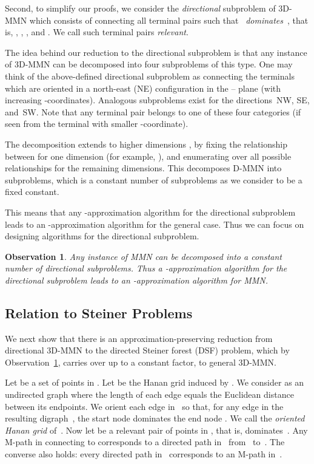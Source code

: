 \documentclass[11pt]{llncs}
\newtheorem{observation}{Observation}
\begin{document}
Second, to simplify our proofs, we consider the \emph{directional}
subproblem of 3D-MMN which consists of connecting all terminal
pairs  such that~ \emph{dominates}~, that is, , , , and .  We call such
terminal pairs \emph{relevant}.  

The idea behind our reduction to the directional subproblem is that
any instance of 3D-MMN can be decomposed into four subproblems of this
type.  One may think of the above-defined directional subproblem as
connecting the terminals which are oriented in a north-east (NE)
configuration in the -- plane (with increasing
-coor\-di\-nates).  Analogous subproblems exist for the
directions~NW, SE, and~SW.  Note that any terminal pair belongs to one
of these four categories (if seen from the terminal with smaller
-coordinate).

The decomposition extends to higher dimensions , by fixing the
relationship between  for one dimension (for example, ), and
enumerating over all possible relationships for the remaining 
dimensions. This decomposes D-MMN into  
subproblems, which is a constant number of subproblems as we consider
 to be a fixed constant.  

This means that any
-approximation algorithm for the directional subproblem leads to
an -approxi\-mation algorithm for the general case.
Thus we can focus on designing algorithms for the directional subproblem.  

\begin{observation} 
  \label{obs:dir-sub} 
  Any instance of MMN can be decomposed into a constant number of
  directional subproblems.  Thus a -approximation algorithm for
  the directional subproblem leads to an -approximation
  algorithm for MMN.
\end{observation}
     

\subsection{Relation to Steiner Problems}
\label{sec:relat-stein-type}

We next show that there is an approximation-preserving reduction
from directional 3D-MMN to the directed Steiner forest (DSF) problem,
which by Observation~\ref{obs:dir-sub}, carries over up to a constant
factor, to general 3D-MMN. 

Let  be a set of  points in .  Let  be the
Hanan grid induced by .  We consider  as an undirected graph
where the length of each edge equals the Euclidean distance between
its endpoints.  We orient each edge in~ so that, for any edge
 in 
the resulting digraph~, the start node  dominates the end node
.  We call  the \emph{oriented Hanan grid} of~.  
Now let
 be a relevant pair of points in , that is, 
dominates~.  Any M-path in  connecting  to  corresponds
to a directed path in~ from~ to~.  The converse also holds:
every directed path in~ corresponds to an M-path in~.
\end{document}
